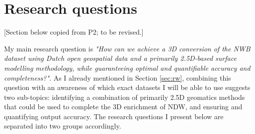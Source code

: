 \section{Research questions}
\label{sec:rq}

[Section below copied from P2; to be revised.]

My main research question is \textit{"How can we achieve a 3D conversion of the NWB dataset using Dutch open geospatial data and a primarily 2.5D-based surface modelling methodology, while guaranteeing optimal and quantifiable accuracy and completeness?"}. As I already mentioned in Section \ref{sec:rw}, combining this question with an awareness of which exact datasets I will be able to use suggests two sub-topics: identifying a combination of primarily 2.5D geomatics methods that could be used to complete the 3D enrichment of NDW, and ensuring and quantifying output accuracy. The research questions I present below are separated into two groups accordingly.

